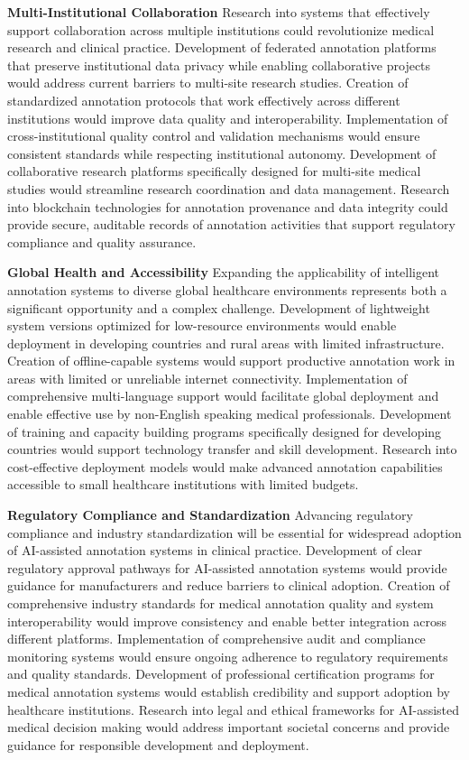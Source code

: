 \textbf{Multi-Institutional Collaboration}
Research into systems that effectively support collaboration across multiple institutions could revolutionize medical research and clinical practice. Development of federated annotation platforms that preserve institutional data privacy while enabling collaborative projects would address current barriers to multi-site research studies. Creation of standardized annotation protocols that work effectively across different institutions would improve data quality and interoperability. Implementation of cross-institutional quality control and validation mechanisms would ensure consistent standards while respecting institutional autonomy. Development of collaborative research platforms specifically designed for multi-site medical studies would streamline research coordination and data management. Research into blockchain technologies for annotation provenance and data integrity could provide secure, auditable records of annotation activities that support regulatory compliance and quality assurance.

\textbf{Global Health and Accessibility}
Expanding the applicability of intelligent annotation systems to diverse global healthcare environments represents both a significant opportunity and a complex challenge. Development of lightweight system versions optimized for low-resource environments would enable deployment in developing countries and rural areas with limited infrastructure. Creation of offline-capable systems would support productive annotation work in areas with limited or unreliable internet connectivity. Implementation of comprehensive multi-language support would facilitate global deployment and enable effective use by non-English speaking medical professionals. Development of training and capacity building programs specifically designed for developing countries would support technology transfer and skill development. Research into cost-effective deployment models would make advanced annotation capabilities accessible to small healthcare institutions with limited budgets.

\textbf{Regulatory Compliance and Standardization}
Advancing regulatory compliance and industry standardization will be essential for widespread adoption of AI-assisted annotation systems in clinical practice. Development of clear regulatory approval pathways for AI-assisted annotation systems would provide guidance for manufacturers and reduce barriers to clinical adoption. Creation of comprehensive industry standards for medical annotation quality and system interoperability would improve consistency and enable better integration across different platforms. Implementation of comprehensive audit and compliance monitoring systems would ensure ongoing adherence to regulatory requirements and quality standards. Development of professional certification programs for medical annotation systems would establish credibility and support adoption by healthcare institutions. Research into legal and ethical frameworks for AI-assisted medical decision making would address important societal concerns and provide guidance for responsible development and deployment.

